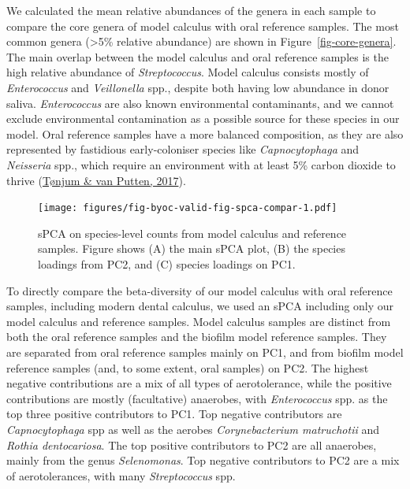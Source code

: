 \documentclass[
  letterpaper,
]{book}
\begin{document}
We calculated the mean relative abundances of the genera in each sample
to compare the core genera of model calculus with oral reference
samples. The most common genera (\textgreater5\% relative abundance) are
shown in Figure~\ref{fig-core-genera}. The main overlap between the
model calculus and oral reference samples is the high relative abundance
of \emph{Streptococcus}. Model calculus consists mostly of
\emph{Enterococcus} and \emph{Veillonella} spp., despite both having low
abundance in donor saliva. \emph{Enterococcus} are also known
environmental contaminants, and we cannot exclude environmental
contamination as a possible source for these species in our model. Oral
reference samples have a more balanced composition, as they are also
represented by fastidious early-coloniser species like
\emph{Capnocytophaga} and \emph{Neisseria} spp., which require an
environment with at least 5\% carbon dioxide to thrive
(\protect\hyperlink{ref-tonjumNeisseria2017}{Tønjum \& van Putten,
2017}).

\begin{figure}

{\centering \texttt{[image: figures/fig-byoc-valid-fig-spca-compar-1.pdf]}

}

\caption{\label{fig-spca-compar}sPCA on species-level counts from model
calculus and reference samples. Figure shows (A) the main sPCA plot, (B)
the species loadings from PC2, and (C) species loadings on PC1.}

\end{figure}

To directly compare the beta-diversity of our model calculus with oral
reference samples, including modern dental calculus, we used an sPCA
including only our model calculus and reference samples. Model calculus
samples are distinct from both the oral reference samples and the
biofilm model reference samples. They are separated from oral reference
samples mainly on PC1, and from biofilm model reference samples (and, to
some extent, oral samples) on PC2. The highest negative contributions
are a mix of all types of aerotolerance, while the positive
contributions are mostly (facultative) anaerobes, with
\emph{Enterococcus} spp. as the top three positive contributors to PC1.
Top negative contributors are \emph{Capnocytophaga} spp as well as the
aerobes \emph{Corynebacterium matruchotii} and \emph{Rothia
dentocariosa}. The top positive contributors to PC2 are all anaerobes,
mainly from the genus \emph{Selenomonas}. Top negative contributors to
PC2 are a mix of aerotolerances, with many \emph{Streptococcus} spp.
\end{document}
